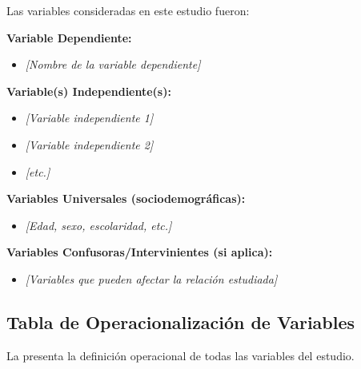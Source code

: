 Las variables consideradas en este estudio fueron:

\textbf{Variable Dependiente:}
\begin{itemize}
    \item \textit{[Nombre de la variable dependiente]}
\end{itemize}

\textbf{Variable(s) Independiente(s):}
\begin{itemize}
    \item \textit{[Variable independiente 1]}
    \item \textit{[Variable independiente 2]}
    \item \textit{[etc.]}
\end{itemize}

\textbf{Variables Universales (sociodemográficas):}
\begin{itemize}
    \item \textit{[Edad, sexo, escolaridad, etc.]}
\end{itemize}

\textbf{Variables Confusoras/Intervinientes (si aplica):}
\begin{itemize}
    \item \textit{[Variables que pueden afectar la relación estudiada]}
\end{itemize}

\subsection{Tabla de Operacionalización de Variables}
\label{subsec:operacionalizacion}

La  presenta la definición operacional de todas las variables del estudio.

